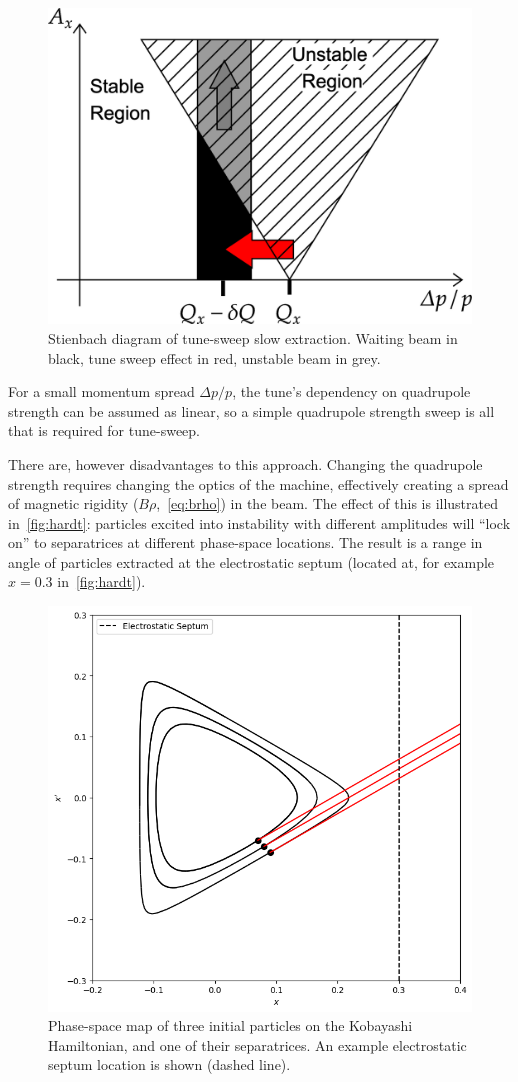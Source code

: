 \documentclass[11pt]{report}
\begin{document}
\begin{figure}
  \centering
  \includegraphics[width=0.6\linewidth]{tune-sweep.png}
  \caption{Stienbach diagram of tune-sweep slow extraction. Waiting beam in black, tune sweep effect in red, unstable beam in grey.}\label{fig:tune-sweep}
\end{figure}

For a small momentum spread $\Delta p/p$, the tune's dependency on quadrupole strength can be assumed as linear, so a simple quadrupole strength sweep is all that is required for tune-sweep.

There are, however disadvantages to this approach. Changing the quadrupole strength requires changing the optics of the machine, effectively creating a spread of magnetic rigidity ($B\rho$,~\autoref{eq:brho}) in the beam. The effect of this is illustrated in~\autoref{fig:hardt}: particles excited into instability with different amplitudes will ``lock on'' to separatrices at different phase-space locations. The result is a range in angle of particles extracted at the electrostatic septum (located at, for example $x=0.3$ in~\autoref{fig:hardt}).

\begin{figure}
  \centering
  \includegraphics[width=0.6\linewidth]{hardt.png}
  \caption{Phase-space map of three initial particles on the Kobayashi Hamiltonian, and one of their separatrices. An example electrostatic septum location is shown (dashed line).}\label{fig:hardt}
\end{figure}
\end{document}
